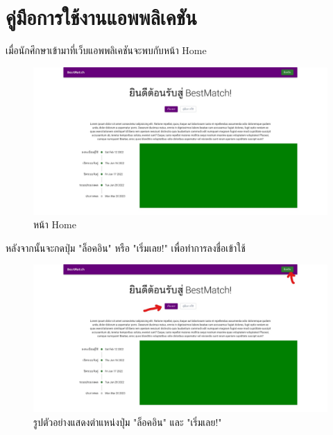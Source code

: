 \section{คู่มือการใช้งานแอพพลิเคชัน}
เมื่อนักศึกษาเข้ามาที่เว็บแอพพลิเคชันจะพบกับหน้า Home
\begin{figure}[h]
  \begin{center}
    \includegraphics[width=\linewidth]{photo/web/student/home.jpeg}
  \end{center}
  \caption{หน้า Home}
\end{figure}
%
\newline
หลังจากนั้นจะกดปุ่ม "ล็อคอิน" หรือ "เริ่มเลย!" เพื่อทำการลงชื่อเข้าใช้
\begin{figure}[ht]
  \begin{center}
    \includegraphics[width=\linewidth]{photo/web/student/login-btn.jpeg}
  \end{center}
  \caption{รูปตัวอย่างแสดงตำแหน่งปุ่ม "ล็อคอิน" และ "เริ่มเลย!"}
\end{figure}
\newpage 

